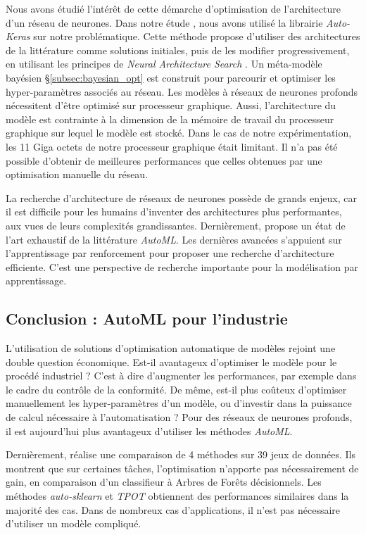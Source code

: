 Nous avons étudié l'intérêt de cette démarche d'optimisation de l'architecture d'un réseau de neurones.
Dans notre étude \cite{nagorny_polarimetric_2019}, nous avons utilisé la librairie \textit{Auto-Keras} \cite{jin_autokeras_2018} sur notre problématique.
Cette méthode propose d'utiliser des architectures de la littérature comme solutions initiales, puis de les modifier progressivement, en utilisant les principes de \textit{Neural Architecture Search} \cite{zoph_neural_2016}.
Un méta-modèle bayésien §\ref{subsec:bayesian_opt} est construit pour parcourir et optimiser les hyper-paramètres associés au réseau.
Les modèles à réseaux de neurones profonds nécessitent d'être optimisé sur processeur graphique.
Aussi, l'architecture du modèle est contrainte à la dimension de la mémoire de travail du processeur graphique sur lequel le modèle est stocké.
Dans le cas de notre expérimentation, les 11 Giga octets de notre processeur graphique était limitant.
Il n'a pas été possible d'obtenir de meilleures performances que celles obtenues par une optimisation manuelle du réseau.

La recherche d'architecture de réseaux de neurones possède de grands enjeux, car il est difficile pour les humains d'inventer des architectures plus performantes, aux vues de leurs complexités grandissantes.
Dernièrement, \cite{elsken_neural_2018} propose un état de l'art exhaustif de la littérature \textit{AutoML}.
Les dernières avancées s'appuient sur l'apprentissage par renforcement pour proposer une recherche d'architecture efficiente.
C'est une perspective de recherche importante pour la modélisation par apprentissage.

\subsection{Conclusion : AutoML pour l'industrie}
L'utilisation de solutions d'optimisation automatique de modèles rejoint une double question économique.
Est-il avantageux d'optimiser le modèle pour le procédé industriel ? C'est à dire d'augmenter les performances, par exemple dans le cadre du contrôle de la conformité.
De même, est-il plus coûteux d'optimiser manuellement les hyper-paramètres d'un modèle, ou d'investir dans la puissance de calcul nécessaire à l'automatisation ?
Pour des réseaux de neurones profonds, il est aujourd'hui plus avantageux d'utiliser les méthodes \textit{AutoML}.

Dernièrement, \citeauthor{gijsbers_open_2019} \cite{gijsbers_open_2019} réalise une comparaison de 4 méthodes sur 39 jeux de données.
Ils montrent que sur certaines tâches, l'optimisation n'apporte pas nécessairement de gain, en comparaison d'un classifieur à Arbres de Forêts décisionnels.
Les méthodes \textit{auto-sklearn} et \textit{TPOT} obtiennent des performances similaires dans la majorité des cas.
Dans de nombreux cas d'applications, il n'est pas nécessaire d'utiliser un modèle compliqué.


